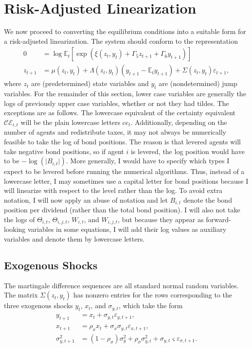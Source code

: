 \documentclass[12 pt, oneside]{article}
\theoremstyle{definition}
\theoremstyle{definition}
\theoremstyle{definition}
\newcommand{\E}{\mathbb{E}}
\newcommand{\calC}{\mathcal{C}}
\newcommand{\calE}{\mathcal{E}}
\begin{document}
\section{Risk-Adjusted Linearization}\label{sec:ral}

We now proceed to converting the equilibrium conditions into a suitable form for a risk-adjusted linearization. The system should conform to the representation
\begin{align*}
  0 & = \log \E_t\left[\exp\left(\xi(z_t, y_t) + \Gamma_5 z_{t + 1} + \Gamma_6 y_{t + 1}\right)\right]\\
  z_{t + 1} & = \mu(z_t, y_t) + \Lambda(z_t, y_t) (y_{t + 1} - \E_t y_{t + 1}) + \Sigma(z_t, y_t) \varepsilon_{t + 1},
\end{align*}
where $z_t$ are (predetermined) state variables and $y_t$ are (nondetermined) jump variables.
For the remainder of this section, lower case variables are generally the logs of previously upper case variables, whether or not they had tildes. The exceptions are as follows. The lowercase equivalent of the certainty equivalent $\calC\calE_{i, t}$ will be the plain lowercase letters $ce_t$. Additionally, depending on the number of agents and redistribute taxes, it may not always be numerically feasible to take the log of bond positions. The reason is that levered agents will take negative bond positions, so if agent $i$ is levered, the log position would have to be $-\log(\vert B_{i, t}\vert)$. More generally, I would have to specify which types I expect to be levered before running the numerical algorithms. Thus, instead of a lowercase letter, I may sometimes use a capital letter for bond positions because I will linearize with respect to the level rather than the log. To avoid extra notation, I will now apply an abuse of notation and let $B_{i, t}$ denote the bond position per dividend (rather than the total bond position). I will also not take the logs of $\Theta_{i, t}$, $\Theta_{i, j, t}$, $W_{i, t}$, and $W_{i, j, t}$, but because they appear as forward-looking variables in some equations, I will add their log values as auxiliary variables and denote them by lowercase letters.


\subsection{Exogenous Shocks}
The martingale difference sequences are all standard normal random variables. The matrix $\Sigma(z_t, y_t)$ has nonzero entries for the rows corresponding to the three exogenous shocks $y_t$, $x_t$, and $\sigma_{y, t}$, which take the form
\begin{align}
  y_{t + 1} & = x_t + \sigma_{y, t} \varepsilon_{y, t + 1},\\
  x_{t + 1} & = \rho_x x_t + \sigma_x\sigma_{y, t} \varepsilon_{x, t + 1},\\
  \sigma^2_{y, t + 1} & = (1 - \rho_\sigma)\sigma^2_y + \rho_\sigma \sigma^2_{y, t} + \sigma_{y, t}\varsigma \varepsilon_{\sigma, t + 1}.
\end{align}
\end{document}
